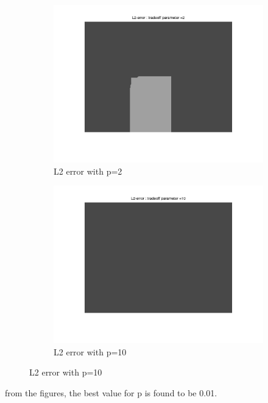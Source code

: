 \documentclass[fleqn]{article}
\begin{document}
\begin{figure}
\begin{subfigure}{0.5\textwidth}
\includegraphics[scale=0.2]{./pics/tsukuba_L2_error_p=2.jpg}
\caption{L2 error with p=2}
\end{subfigure}
 \begin{subfigure}{0.5\textwidth}
\includegraphics[scale=0.2]{./pics/tsukuba_L2_error_p=10.jpg}
\caption{L2 error with p=10}
\end{subfigure}
\end{figure}
from the figures, the best value for p is found to be 0.01.
\end{document}
